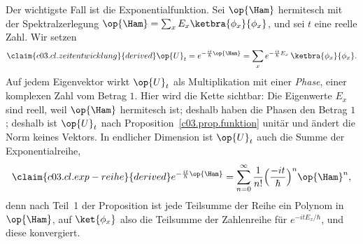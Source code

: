 Der wichtigste Fall ist die Exponentialfunktion. Sei $\op{\Ham}$ hermitesch mit der
Spektralzerlegung $\op{\Ham} = \sum_x E_x \ketbra{\phi_x}{\phi_x}$, und sei $t$ eine reelle Zahl.
Wir setzen
\begin{equation}\label{c03.eq.zeitentwicklung}\claim{c03.cl.zeitentwicklung}{derived}
  \op{U}_t = e^{-\frac{i t}{\hbar}\op{\Ham}}
  = \sum_{x} e^{-\frac{i t}{\hbar} E_x}\, \ketbra{\phi_x}{\phi_x} .
\end{equation}
Auf jedem Eigenvektor wirkt $\op{U}_t$ als Multiplikation mit einer \emph{Phase}, einer
komplexen Zahl vom Betrag $1$. Hier wird die Kette sichtbar: Die Eigenwerte $E_x$ sind reell,
weil $\op{\Ham}$ hermitesch ist; deshalb haben die Phasen den Betrag $1$; deshalb ist
$\op{U}_t$ nach Proposition~\ref{c03.prop.funktion} unitär und ändert die Norm keines Vektors.
In endlicher Dimension ist $\op{U}_t$ auch die Summe der Exponentialreihe,
\begin{equation}\label{c03.eq.exp-reihe}\claim{c03.cl.exp-reihe}{derived}
  e^{-\frac{i t}{\hbar}\op{\Ham}} = \sum_{n=0}^{\infty} \frac{1}{n!}\Bigl(\frac{-i t}{\hbar}\Bigr)^{n} \op{\Ham}^n ,
\end{equation}
denn nach Teil~1 der Proposition ist jede Teilsumme der Reihe ein Polynom in $\op{\Ham}$, auf
$\ket{\phi_x}$ also die Teilsumme der Zahlenreihe für $e^{-i t E_x/\hbar}$, und diese
konvergiert.

